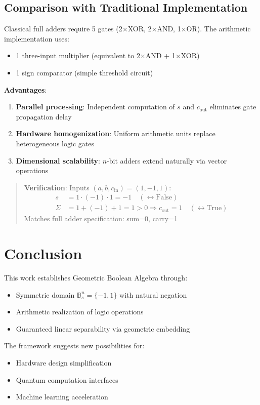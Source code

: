 \documentclass{article}
\begin{document}
\subsection{Comparison with Traditional Implementation}
Classical full adders require 5 gates (2$\times$XOR, 2$\times$AND, 1$\times$OR). The arithmetic implementation uses:
\begin{itemize}
\item 1 three-input multiplier (equivalent to 2$\times$AND + 1$\times$XOR)
\item 1 sign comparator (simple threshold circuit)
\end{itemize}

\textbf{Advantages}:
\begin{enumerate}
\item \textbf{Parallel processing}: Independent computation of $s$ and $c_{\text{out}}$ eliminates gate propagation delay
\item \textbf{Hardware homogenization}: Uniform arithmetic units replace heterogeneous logic gates
\item \textbf{Dimensional scalability}: $n$-bit adders extend naturally via vector operations
\end{enumerate}

\begin{quote}
\textbf{Verification}:
Inputs \((a,b,c_{\text{in}}) = (1,-1,1)\):
\begin{align*}
s &= 1 \cdot (-1) \cdot 1 = -1 \quad (\leftrightarrow \text{False}) \\
\Sigma &= 1 + (-1) + 1 = 1 > 0 \Rightarrow c_{\text{out}} = 1 \quad (\leftrightarrow \text{True})
\end{align*}
Matches full adder specification: sum=0, carry=1
\end{quote}
\section{Conclusion}

This work establishes Geometric Boolean Algebra through:
\begin{itemize}
\item Symmetric domain $\mathbb{B}_s^n = \{-1,1\}$ with natural negation
\item Arithmetic realization of logic operations
\item Guaranteed linear separability via geometric embedding
\end{itemize}

The framework suggests new possibilities for:
\begin{itemize}
\item Hardware design simplification
\item Quantum computation interfaces
\item Machine learning acceleration
\end{itemize}
\end{document}
